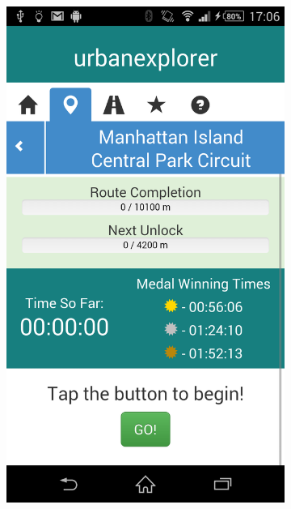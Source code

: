 \documentclass{beamer}
\begin{document}
\begin{frame}
\begin{figure}[h]
\begin{subfigure}[b]{0.3\textwidth}
      \includegraphics[width=\textwidth]{images/route.png}
    \end{subfigure}
    \hspace{0.02\textwidth}
    \begin{subfigure}[b]{0.3\textwidth}

\end{subfigure}
\end{figure}
\end{frame}
\end{document}
